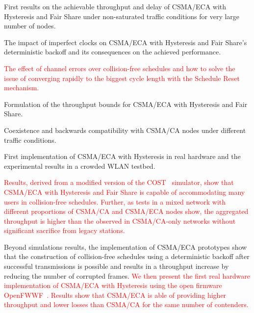 \documentclass[a4paper,journal]{IEEEtran}
\begin{document}
\begin{itemize}
	\item First results on the achievable throughput and delay of CSMA/ECA with Hysteresis and Fair Share under non-saturated traffic conditions for very large number of nodes.
	\item The impact of imperfect clocks on CSMA/ECA with Hysteresis and Fair Share's deterministic backoff and its consequences on the achieved performance.
	\textcolor{red}{\item The effect of channel errors over collision-free schedules and how to solve the issue of converging rapidly to the biggest cycle length with the Schedule Reset mechanism.}
	\item Formulation of the throughput bounds for CSMA/ECA with Hysteresis and Fair Share.
	\item Coexistence and backwards compatibility with CSMA/CA nodes under different traffic conditions.
	\item First implementation of CSMA/ECA with Hysteresis in real hardware and the experimental results in a crowded WLAN testbed.
\end{itemize}

\textcolor{red}{Results, derived from a modified version of the COST~\cite{COST} simulator, show that CSMA/ECA with Hysteresis and Fair Share is capable of accommodating many users in collision-free schedules. Further, as tests in a mixed network with different proportions of CSMA/CA and CSMA/ECA nodes show, the aggregated throughput is higher than the observed in CSMA/CA-only networks without significant sacrifice from legacy stations.}

Beyond simulations results, the implementation of CSMA/ECA prototypes\cite{ECA-DEMO-INFOCOM14, sanabria2013prototyping, BECA-test,CF-MAC} show that the construction of collision-free schedules using a deterministic backoff after successful transmissions is possible and results in a throughput increase by reducing the number of corrupted frames. \textcolor{red}{We then present the first real hardware implementation of CSMA/ECA with Hysteresis using the open firmware OpenFWWF~\cite{OpenFWWF}. Results show that CSMA/ECA is able of providing higher throughput and lower losses than CSMA/CA for the same number of contenders.}
\end{document}
